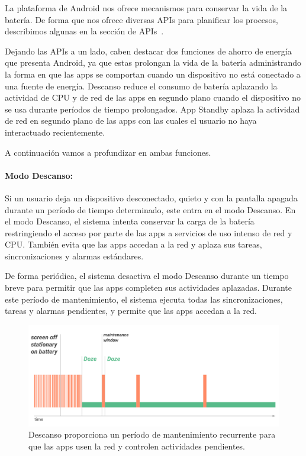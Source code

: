 

La plataforma de Android nos ofrece mecanismos para conservar
 la vida de la batería. De forma que nos ofrece diversas APIs para
 planificar los procesos, describimos algunas en la sección de APIs~\cite{jobdispatcher}.

Dejando las APIs a un lado, caben destacar  dos funciones de
 ahorro de energía que presenta Android, ya que estas prolongan 
la vida de la batería administrando la forma en que las apps se 
comportan cuando un dispositivo no está conectado a una 
fuente de energía. Descanso reduce el consumo de batería
 aplazando la actividad de CPU y de red de las apps en segundo
 plano cuando el dispositivo no se usa durante períodos de
 tiempo prolongados. App Standby aplaza la actividad de red 
en segundo plano de las apps con las cuales el usuario no haya
 interactuado recientemente.

A continuación vamos a profundizar en ambas funciones.

\paragraph{Modo Descanso:}

Si un usuario deja un dispositivo desconectado, quieto y con la 
pantalla apagada durante un período de tiempo determinado, este 
entra en el modo Descanso. En el modo Descanso, el sistema intenta 
conservar la carga de la batería restringiendo el acceso por parte de
 las apps a servicios de uso intenso de red y CPU. También evita que
 las apps accedan a la red y aplaza sus tareas, sincronizaciones
 y alarmas estándares.

De forma periódica, el sistema desactiva el modo Descanso durante 
un tiempo breve para permitir que las apps completen sus actividades 
aplazadas. Durante este período de mantenimiento, el sistema ejecuta
 todas las sincronizaciones, tareas y alarmas pendientes, y permite 
que las apps accedan a la red.
\begin{figure}[h]
\includegraphics[scale=0.20]{imagenes/doze.png} 
\caption{Descanso proporciona un período de mantenimiento
 recurrente para que las apps usen la red y controlen actividades pendientes.}
\end{figure}



